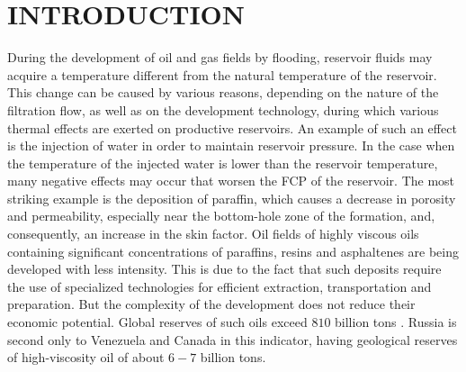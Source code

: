 \documentclass[
11pt,%
tightenlines,%
twoside,%
onecolumn,%
nofloats,%
nobibnotes,%
nofootinbib,%
superscriptaddress,%
noshowpacs,%
centertags]%
{revtex4-2}
\begin{document}
\maketitle




\section*{INTRODUCTION}
	During the development of oil and gas fields by flooding, reservoir fluids may acquire a temperature different from the natural temperature of the reservoir. This change can be caused by various reasons, depending on the nature of the filtration flow, as well as on the development technology, during which various thermal effects are exerted on productive reservoirs. An example of such an effect is the injection of water in order to maintain reservoir pressure. In the case when the temperature of the injected water is lower than the reservoir temperature, many negative effects may occur that worsen the FCP of the reservoir. The most striking example is the deposition of paraffin, which causes a decrease in porosity and permeability, especially near the bottom-hole zone of the formation, and, consequently, an increase in the skin factor. Oil fields of highly viscous oils containing significant concentrations of paraffins, resins and asphaltenes are being developed with less intensity. This is due to the fact that such deposits require the use of specialized technologies for efficient extraction, transportation and preparation. But the complexity of the development does not reduce their economic potential. Global reserves of such oils exceed $810$ billion tons \cite{1}. Russia is second only to Venezuela and Canada in this indicator, having geological reserves of high-viscosity oil of about $6-7$ billion tons. 
\end{document}
